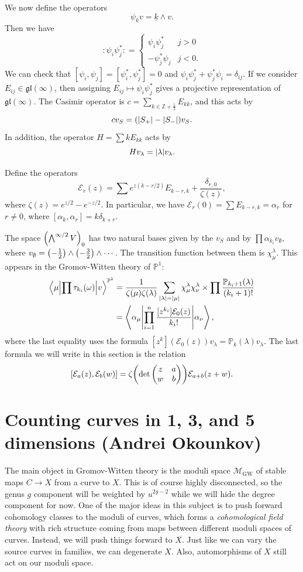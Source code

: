 \documentclass[leqno, openany]{memoir}
\theoremstyle{definition}
\theoremstyle{remark}
\theoremstyle{plain}
\theoremstyle{definition}
\theoremstyle{remark}
\newcommand{\Z}{\mathbb{Z}}
\renewcommand{\P}{\mathbb{P}}
\newcommand{\mc}[1]{\mathcal{#1}}
\newcommand{\mf}[1]{\mathfrak{#1}}
\newcommand{\mr}[1]{\mathrm{#1}}
\newcommand{\ul}[1]{\underline{#1}}
\begin{document}
We now define the operators
\[ \psi_k v = \ul{k} \wedge v. \]
Then we have
\[ :\psi_i \psi_j^*: = \begin{cases}
    \psi_i \psi_j^* & j > 0 \\
    - \psi_j^* \psi_j & j < 0.
\end{cases}
\]
We can check that $[\psi_i, \psi_j] = [\psi_i^*, \psi_j^*] = 0$ and $\psi_i \psi_j^* + \psi_j^* \psi_i = \delta_{ij}$. If we consider $E_{ij} \in \mf{gl}(\infty)$, then assigning $E_{ij} \mapsto \psi_i \psi_j^*$ gives a projective representation of $\mf{gl}(\infty)$. The Casimir operator is $c = \sum_{k \in \Z + \frac{1}{2}} E_{kk}$, and this acts by
\[ c v_S = (\abs{S_+} - \abs{S_-}) v_S. \]
In addition, the operator $H = \sum k E_{kk}$ acts by 
\[ H v_{\lambda} = \abs{\lambda} v_{\lambda}. \]

Define the operators
\[ \mc{E}_r(z) = \sum e^{z(k-r/2)} E_{k-r,k} + \frac{\delta_{r,0}}{\zeta(z)}, \]
where $\zeta(z) = e^{z/2} - e^{-z/2}$. In particular, we have $\mc{E}_r(0) = \sum E_{k-r, k} = \alpha_r$ for $r \neq 0$, where $[\alpha_k, \alpha_r] = k \delta_{k+r}$.

The space $\qty(\bigwedge^{\infty/2} V)_0$ has two natural bases given by the $v_S$ and by $\prod \alpha_{k_i} v_{\emptyset}$, where $v_{\emptyset} = \qty(-\frac{1}{2}) \wedge \qty(-\frac{3}{2}) \wedge \cdots$. The transition function between them is $\chi_{\mu}^{\lambda}$. This appears in the Gromov-Witten theory of $\P^1$:
\begin{align*} 
    \mel**{\mu}{\prod \tau_{k_i}(\omega)}{v}^{\P^1} &= \frac{1}{\zeta(\mu) \zeta(\lambda)} \sum_{\abs{\lambda} = \abs{\mu}} \chi_{\mu}^{\lambda} \chi_{\nu}^{\lambda} \times \prod \frac{\P_{k_i+1}(\lambda)}{(k_i+1)!} \\ 
    &= \mel**{\alpha_{\mu}}{\prod_{i=1}^n \frac{[z^{k_i}] \mc{E}_0(z)}{k_i!}}{\alpha_{\nu}},
\end{align*}
where the last equality uses the formula $[z^k](\mc{E}_0(z)) v_{\lambda} = \P_k(\lambda) v_{\lambda}$. The last formula we will write in this section is the relation
\[ [\mc{E}_a(z), \mc{E}_b(w)] = \zeta\qty(\det \mqty(z & a \\ w & b)) \mc{E}_{a+b}(z+w). \]

\chapter{Counting curves in 1, 3, and 5 dimensions (Andrei Okounkov)}%
\label{cha:andrei}

The main object in Gromov-Witten theory is the moduli space $\mc{M}_{\mr{GW}}$ of stable maps $C \to X$ from a curve to $X$. This is of course highly disconnected, so the genus $g$ component will be weighted by $u^{2g-2}$ while we will hide the degree component for now. One of the major ideas in this subject is to push forward cohomology classes to the moduli of curves, which forms a \textit{cohomological field theory} with rich structure coming from maps between different moduli spaces of curves. Instead, we will push things forward to $X$. Just like we can vary the source curves in families, we can degenerate $X$. Also, automorphisms of $X$ still act on our moduli space.
\end{document}
